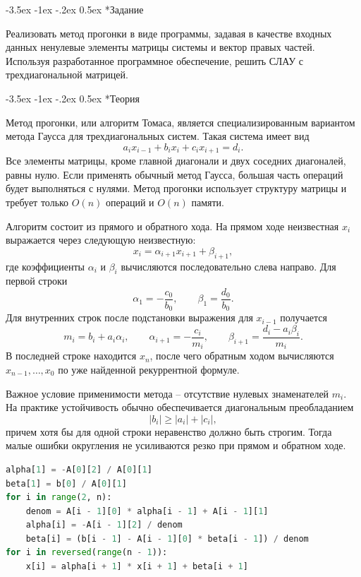 \documentclass[14pt, a4paper]{article}
\makeatletter
\renewcommand\section{\@startsection {section}{1}{\parindent}%
  {-3.5ex \@plus -1ex \@minus -.2ex}%
  {0.5ex}%
  {\normalfont\Large\bfseries}}
\makeatother
\begin{document}
\section*{Задание}
Реализовать метод прогонки в виде программы, задавая в качестве входных данных ненулевые элементы матрицы системы и вектор правых частей. Используя разработанное программное обеспечение, решить СЛАУ с трехдиагональной матрицей.

\section*{Теория}
Метод прогонки, или алгоритм Томаса, является специализированным вариантом метода Гаусса для трехдиагональных систем. Такая система имеет вид
\[
    a_i x_{i-1}+b_i x_i+c_i x_{i+1}=d_i.
\]
Все элементы матрицы, кроме главной диагонали и двух соседних диагоналей, равны нулю. Если применять обычный метод Гаусса, большая часть операций будет выполняться с нулями. Метод прогонки использует структуру матрицы и требует только $O(n)$ операций и $O(n)$ памяти.

Алгоритм состоит из прямого и обратного хода. На прямом ходе неизвестная $x_i$ выражается через следующую неизвестную:
\[
    x_i=\alpha_{i+1}x_{i+1}+\beta_{i+1},
\]
где коэффициенты $\alpha_i$ и $\beta_i$ вычисляются последовательно слева направо. Для первой строки
\[
    \alpha_1=-\frac{c_0}{b_0}, \qquad \beta_1=\frac{d_0}{b_0}.
\]
Для внутренних строк после подстановки выражения для $x_{i-1}$ получается
\[
    m_i=b_i+a_i\alpha_i,\qquad
    \alpha_{i+1}=-\frac{c_i}{m_i},\qquad
    \beta_{i+1}=\frac{d_i-a_i\beta_i}{m_i}.
\]
В последней строке находится $x_n$, после чего обратным ходом вычисляются $x_{n-1},\ldots,x_0$ по уже найденной рекуррентной формуле.

Важное условие применимости метода -- отсутствие нулевых знаменателей $m_i$. На практике устойчивость обычно обеспечивается диагональным преобладанием
\[
    |b_i|\ge |a_i|+|c_i|,
\]
причем хотя бы для одной строки неравенство должно быть строгим. Тогда малые ошибки округления не усиливаются резко при прямом и обратном ходе.

\begin{lstlisting}[language=Python]
alpha[1] = -A[0][2] / A[0][1]
beta[1] = b[0] / A[0][1]
for i in range(2, n):
    denom = A[i - 1][0] * alpha[i - 1] + A[i - 1][1]
    alpha[i] = -A[i - 1][2] / denom
    beta[i] = (b[i - 1] - A[i - 1][0] * beta[i - 1]) / denom
for i in reversed(range(n - 1)):
    x[i] = alpha[i + 1] * x[i + 1] + beta[i + 1]
\end{lstlisting}
\end{document}
